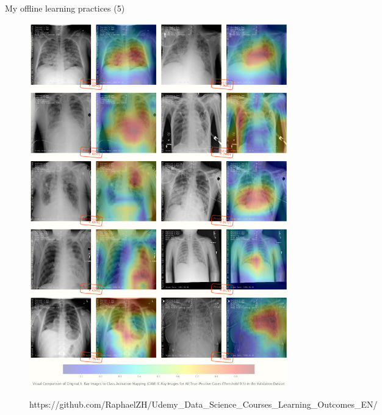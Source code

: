 \documentclass{beamer}
\begin{document}
\begin{frame}[fragile]{My offline learning practices (5)}
\begin{figure}[!htb]
			\endminipage\hfill
			\centering\includegraphics[width=\linewidth]{images/deep_learning_5_2.png}
			\endminipage\hfill
			\vspace{.2em}
			\begin{columns}
				\normalfont\footnotesize{https://github.com/RaphaelZH/Udemy\_Data\_Science\_Courses\_Learning\_Outcomes\_EN/}
			\end{columns}
		\end{figure}
	\end{frame}
	
\end{document}
